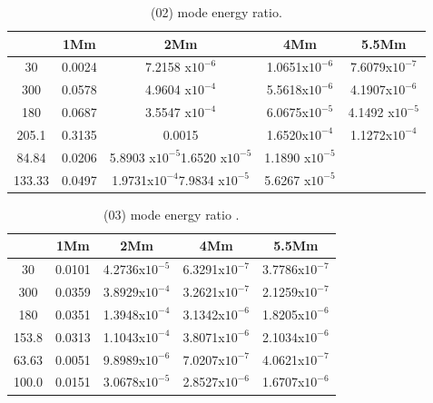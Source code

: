 \documentclass[authoryear,final,1p]{elsarticle}
\begin{document}
\begin{table}
\centering
\begin{tabular}{c c c c c }
\hline
   &  1Mm & 2Mm & 4Mm & 5.5Mm \\
\hline
30 &  0.0024 & 7.2158 x$10^{-6}$ & 1.0651x$10^{-6}$ & 7.6079x$10^{-7}$\\
\hline
300 & 0.0578 & 4.9604 x$10^{-4}$ & 5.5618x$10^{-6}$ & 4.1907x$10^{-6}$\\
\hline
180 & 0.0687 & 3.5547 x$10^{-4}$ & 6.0675x$10^{-5}$ & 4.1492 x$10^{-5}$\\
\hline
205.1 & 0.3135 & 0.0015 &1.6520x$10^{-4}$ & 1.1272x$10^{-4}$\\
\hline
84.84 & 0.0206 &5.8903 x$10^{-5}$1.6520 x$10^{-5}$ & 1.1890 x$10^{-5}$\\
\hline
133.33 & 0.0497 & 1.9731x$10^{-4}$7.9834 x$10^{-5}$ & 5.6267 x$10^{-5}$\\
\hline
\end{tabular} 
\caption{ (02) mode energy ratio.}
\end{table}




\begin{table}
\centering
\begin{tabular}{c c c c c }
\hline
   &  1Mm & 2Mm & 4Mm & 5.5Mm \\
\hline
30 &  0.0101 &  4.2736x$10^{-5}$ & 6.3291x$10^{-7}$ & 3.7786x$10^{-7}$\\
\hline
300 & 0.0359 & 3.8929x$10^{-4}$ & 3.2621x$10^{-7}$ & 2.1259x$10^{-7}$\\
\hline
180 & 0.0351 &1.3948x$10^{-4}$ & 3.1342x$10^{-6}$ & 1.8205x$10^{-6}$\\
\hline
153.8 & 0.0313 & 1.1043x$10^{-4}$ & 3.8071x$10^{-6}$ & 2.1034x$10^{-6}$\\
\hline
63.63 & 0.0051 & 9.8989x$10^{-6}$ & 7.0207x$10^{-7}$ & 4.0621x$10^{-7}$\\
\hline
100.0 & 0.0151 & 3.0678x$10^{-5}$ & 2.8527x$10^{-6}$ & 1.6707x$10^{-6}$\\
\hline
\end{tabular} 
\caption{ (03) mode energy ratio .}
\end{table}
\end{document}
